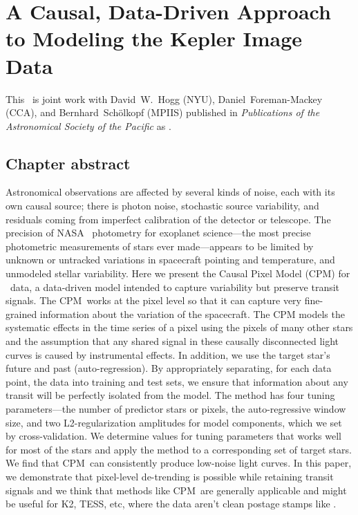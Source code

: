 \renewcommand{\chapid}{cpm}


\newcommand{\notenglish}[1]{\textit{#1}}
\newcommand{\sic}{\notenglish{sic}}
\newcommand{\Kepler}{\project{Kepler}}
\newcommand{\name}{CPM}
\newcommand{\set}[1]{\mathcal{#1}}
\newcommand{\given}{\,|\,}
\newcommand{\todo}[1]{\textbf{#1}}
\newcommand{\revise}[1]{\textcolor{darkgreen}{#1}}
\newcommand{\remove}[1]{\sout{#1}}

\newcommand{\Bernhard}[1]{$\bullet$\footnote{{\bf Bernhard:} #1}}
\newcommand{\Dun}[1]{$\bullet$\footnote{{\bf Dun:} #1}}

\chapter{A Causal, Data-Driven Approach to Modeling the Kepler Image Data}

This \paper\ is joint work with David~W.~Hogg (NYU), Daniel~Foreman-Mackey (CCA),
and Bernhard~Sch\"olkopf (MPIIS) published in \emph{Publications of the
Astronomical Society of the Pacific} as \citet{cpm}.

\section{Chapter abstract}
Astronomical observations are affected by several kinds of noise, each with its own causal source; 
there is photon noise, stochastic source variability, and residuals coming from imperfect calibration of the detector or telescope. 
The precision of NASA \Kepler\ photometry for exoplanet science---the most precise photometric measurements of stars ever made---appears to be limited by unknown or untracked variations in spacecraft pointing and temperature, and unmodeled stellar variability. 
Here we present the Causal Pixel Model (\name) for \Kepler\ data, a data-driven model intended to capture variability but preserve transit signals. 
The \name\ works at the pixel level so that it can capture very fine-grained information about the variation of the spacecraft.
The CPM models the systematic effects in the time series of a pixel using the pixels of many other stars and the assumption that any shared signal in these causally disconnected light curves is caused by instrumental effects. 
In addition, we use the target star's future and past (auto-regression). 
By appropriately separating, for each data point, the data into training and test sets, 
  we ensure that information about any transit will be perfectly isolated from the model. 
The method has four tuning parameters---the number of predictor stars or pixels, the auto-regressive window size, 
and two L2-regularization amplitudes for model components, which we set by cross-validation. 
We determine values for tuning parameters that works well for most of the stars and apply the method to a corresponding set of target stars.
We find that \name\ can consistently produce low-noise light curves. In this paper, we demonstrate that pixel-level de-trending is possible while retaining transit signals and we think that methods like \name\ are generally applicable and might be useful for  K2, TESS, etc, where the data aren't clean postage stamps like \Kepler.


